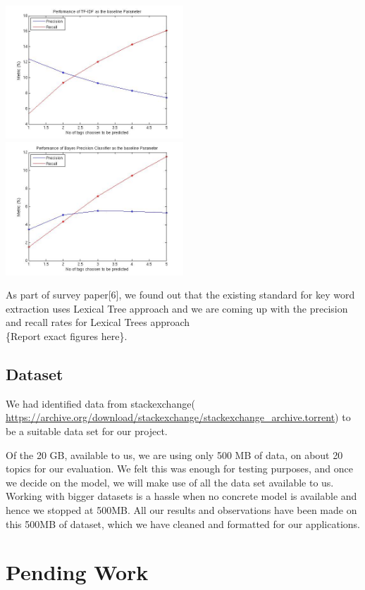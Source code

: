 \documentclass[dvips,12pt]{article}
\begin{document}
		\includegraphics[width=0.5\textwidth]{../baseline/TfIdf.jpg}
		\includegraphics[width=0.5\textwidth]{../baseline/BayesPrecisionClassifier.jpg}
				
		As part of survey paper[6], we found out that the existing standard for key word extraction uses Lexical Tree approach and we are coming up with the precision and recall rates for Lexical Trees approach \\\{Report exact figures here\}.
		
		\subsection{Dataset}
		
		We had identified data from stackexchange( \url{https://archive.org/download/stackexchange/stackexchange_archive.torrent}) to be a suitable data set for our project. 
		
		Of the 20 GB, available to us, we are using only 500 MB of data, on about 20 topics for our evaluation. We felt this was enough for testing purposes, and once we decide on the model, we will make use of all the data set available to us. Working with bigger datasets is a hassle when no concrete model is available and hence we stopped at 500MB.
		All our results and observations have been made on this 500MB of dataset, which we have cleaned and formatted for our applications. 
	

\section{Pending Work}
	
\end{document}

